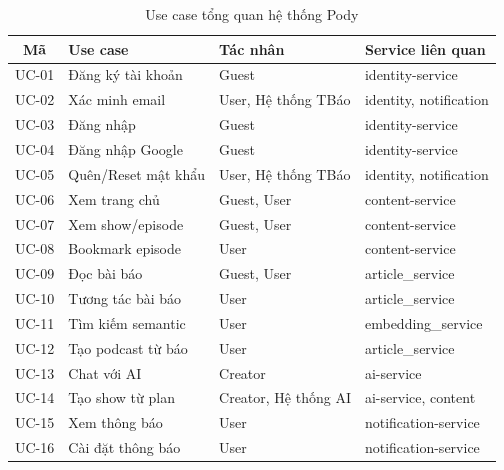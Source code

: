 \documentclass[14pt,a4paper,oneside]{extreport}
\begin{document}
\begin{table}[H]
\centering
\caption{Use case tổng quan hệ thống Pody}
\label{tab:usecase-tq}
\renewcommand{\arraystretch}{1.3}
\small
\begin{tabularx}{\textwidth}{|c|l|l|X|}
\hline
\textbf{Mã} & \textbf{Use case} & \textbf{Tác nhân} & \textbf{Service liên quan} \\
\hline
UC-01 & Đăng ký tài khoản & Guest & identity-service \\
\hline
UC-02 & Xác minh email & User, Hệ thống TBáo & identity, notification \\
\hline
UC-03 & Đăng nhập & Guest & identity-service \\
\hline
UC-04 & Đăng nhập Google & Guest & identity-service \\
\hline
UC-05 & Quên/Reset mật khẩu & User, Hệ thống TBáo & identity, notification \\
\hline
UC-06 & Xem trang chủ & Guest, User & content-service \\
\hline
UC-07 & Xem show/episode & Guest, User & content-service \\
\hline
UC-08 & Bookmark episode & User & content-service \\
\hline
UC-09 & Đọc bài báo & Guest, User & article\_service \\
\hline
UC-10 & Tương tác bài báo & User & article\_service \\
\hline
UC-11 & Tìm kiếm semantic & User & embedding\_service \\
\hline
UC-12 & Tạo podcast từ báo & User & article\_service \\
\hline
UC-13 & Chat với AI & Creator & ai-service \\
\hline
UC-14 & Tạo show từ plan & Creator, Hệ thống AI & ai-service, content \\
\hline
UC-15 & Xem thông báo & User & notification-service \\
\hline
UC-16 & Cài đặt thông báo & User & notification-service \\
\hline
\end{tabularx}
\end{table}


\end{document}
